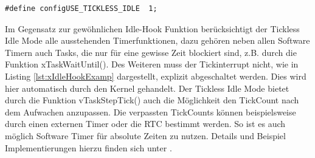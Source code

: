 \begin{lstlisting}[label=lst:defineTicklessIdle, numbers = none]
#define configUSE_TICKLESS_IDLE  1; 
\end{lstlisting}
Im Gegensatz zur gewöhnlichen Idle-Hook Funktion be\-rück\-sich\-tigt der Tickless Idle Mode alle ausstehenden Timerfunktionen, dazu gehören neben allen Software Timern auch Tasks, die nur für eine gewisse Zeit blockiert sind, z.B. durch die Funktion xTaskWaitUntil(). Des Weiteren muss der Tickinterrupt nicht, wie in Listing \ref{lst:xIdleHookExamp} dargestellt, explizit abgeschaltet werden. Dies wird hier automatisch durch den Kernel gehandelt. Der Tickless Idle Mode bietet durch die Funktion vTaskStepTick() auch die Möglichkeit den TickCount nach dem Aufwachen anzupassen. Die verpassten TickCounts können beispielsweise durch einen externen Timer oder die RTC bestimmt werden. So ist es auch möglich Software Timer für absolute Zeiten zu nutzen. Details und Beispiel Implementierungen hierzu finden sich unter \cite{FreeRtosAdvanced}.  

